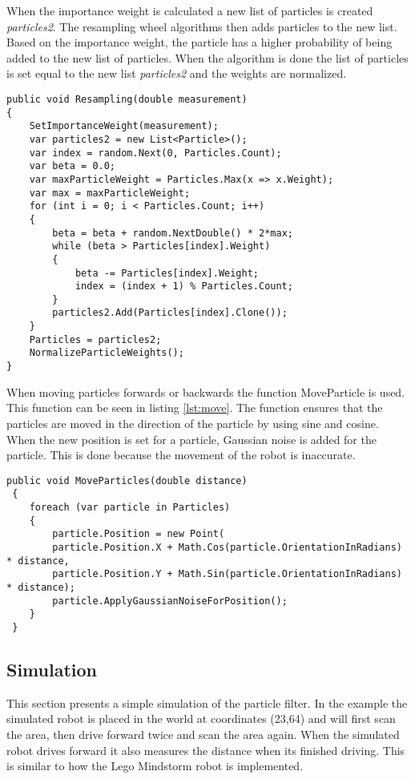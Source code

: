 When the importance weight is calculated a new list of particles is created \emph{particles2}. The resampling wheel algorithms then adds particles to the new list. Based on the importance weight, the particle has a higher probability of being added to the new list of particles. When the algorithm is done the list of particles is set equal to the new list \emph{particles2} and the weights are normalized.

\lstset{style=sharpc}
\begin{lstlisting}[caption={Resampling wheel}, label=lst:wheel, mathescape=true]                          
public void Resampling(double measurement)
{
	SetImportanceWeight(measurement);
	var particles2 = new List<Particle>();
	var index = random.Next(0, Particles.Count);
	var beta = 0.0;
	var maxParticleWeight = Particles.Max(x => x.Weight);
	var max = maxParticleWeight;
	for (int i = 0; i < Particles.Count; i++)
	{
		beta = beta + random.NextDouble() * 2*max;
		while (beta > Particles[index].Weight)
		{
			beta -= Particles[index].Weight;
			index = (index + 1) % Particles.Count;
		}
		particles2.Add(Particles[index].Clone());
	}
	Particles = particles2;
	NormalizeParticleWeights();
}
\end{lstlisting}

When moving particles forwards or backwards the function MoveParticle is used. This function can be seen in listing \ref{lst:move}. The function ensures that the particles are moved in the direction of the particle by using sine and cosine. When the new position is set for a particle, Gaussian noise is added for the particle. This is done because the movement of the robot is inaccurate. 

\lstset{style=sharpc}
\begin{lstlisting}[caption={Resampling wheel}, label=lst:move,  basicstyle=\tiny, mathescape=true]        
public void MoveParticles(double distance)
 {
 	foreach (var particle in Particles)
 	{
 		particle.Position = new Point(
 		particle.Position.X + Math.Cos(particle.OrientationInRadians) * distance, 
 		particle.Position.Y + Math.Sin(particle.OrientationInRadians) * distance); 
 		particle.ApplyGaussianNoiseForPosition();
 	}
 }
\end{lstlisting}

\subsection{Simulation}
This section presents a simple simulation of the particle filter. In the example the simulated robot is placed in the world at coordinates (23,64) and will first scan the area, then drive forward twice and scan the area again. When the simulated robot drives forward it also measures the distance when its finished driving. This is similar to how the Lego Mindstorm robot is implemented.

